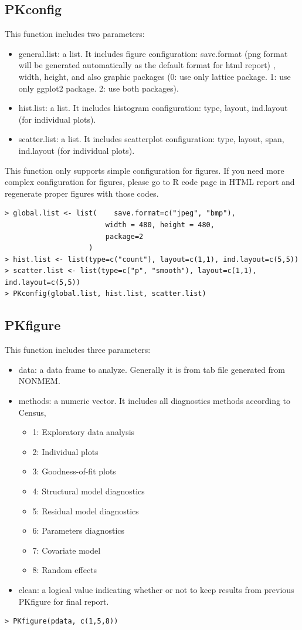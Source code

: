 \documentclass[a4paper]{article}
\begin{document}
\subsection{PKconfig}
This function includes two parameters:
\begin{itemize}
\item general.list: a list. It includes figure configuration: save.format (png format will be generated automatically as the default format for html report) , width, height, and also graphic packages (0: use only lattice package. 1: use only ggplot2 package. 2: use both packages).
\item hist.list: a list. It includes histogram configuration: type, layout, ind.layout (for individual plots).
\item scatter.list: a list. It includes scatterplot configuration: type, layout, span, ind.layout (for individual plots).
\end{itemize}
This function only supports simple configuration for figures. If you need more complex configuration for figures, please go to R code page in HTML report and regenerate proper figures with those codes.
\begin{verbatim}
> global.list <- list(    save.format=c("jpeg", "bmp"),
                        width = 480, height = 480,
                        package=2
                    )
> hist.list <- list(type=c("count"), layout=c(1,1), ind.layout=c(5,5))
> scatter.list <- list(type=c("p", "smooth"), layout=c(1,1), ind.layout=c(5,5))
> PKconfig(global.list, hist.list, scatter.list)
\end{verbatim}

\subsection{PKfigure}
This function includes three parameters:
\begin{itemize}
	\item data: a data frame to analyze. Generally it is from tab file generated from NONMEM.
\item methods: a numeric vector. It includes all diagnostics methods according to Census,
\begin{itemize}
\item 1: Exploratory data analysis
\item 2: Individual plots
\item 3: Goodness-of-fit plots
\item 4: Structural model diagnostics
\item 5: Residual model diagnostics
\item 6: Parameters diagnostics
\item 7: Covariate model
\item 8: Random effects
\end{itemize}
\item clean: a logical value indicating whether or not to keep results from previous PKfigure for final report.
\end{itemize}
\begin{verbatim}
> PKfigure(pdata, c(1,5,8))
\end{verbatim}
\end{document}
